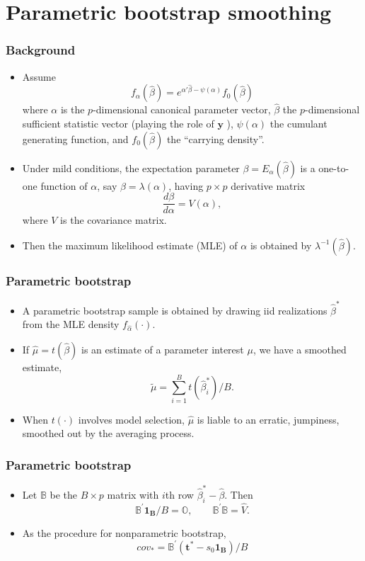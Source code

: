 \documentclass{beamer}
\begin{document}
\section{Parametric bootstrap smoothing}
\begin{frame}
\frametitle{Background}
\begin{itemize}
\item Assume $$f_\alpha(\hat{\beta}) = e^{\alpha'\hat{\beta} - \psi(\alpha)} f_0(\hat{\beta})$$
where $\alpha$ is the $p$-dimensional canonical parameter vector, $\hat{\beta}$ the $p$-dimensional sufficient statistic vector (playing the role of $\mathbf{y}$ ), $\psi(\alpha)$ the cumulant generating function, and $f_0(\hat{\beta})$ the ``carrying density''.
\item Under mild conditions, the expectation parameter $\beta= E_\alpha (\hat{\beta})$ is a one-to-one function of $\alpha$, say $\beta = \lambda(\alpha)$, having $p\times p$ derivative matrix
$$ \frac{d\beta}{d\alpha} = V(\alpha),$$
where $V$ is the covariance matrix. 
\item Then the maximum likelihood estimate (MLE) of $\alpha$ is obtained by $\lambda^{-1}(\hat{\beta})$.
\end{itemize}
\end{frame}
\begin{frame}
\frametitle{Parametric bootstrap}
\begin{itemize}
\item A parametric bootstrap sample is obtained by drawing iid realizations $\hat{\beta}^*$ from the MLE density $f_{\hat{\alpha}}(\cdot)$.
\item If $\hat{\mu} = t(\hat{\beta})$ is an estimate of a parameter interest $\mu$, we have a smoothed estimate,
$$ \tilde{\mu} = \sum_{i=1} ^B t(\hat{\beta}_i ^*)/B.$$
\item When $t(\cdot)$ involves model selection, $\hat{\mu}$ is liable to an erratic, jumpiness, smoothed out by the averaging process.
\end{itemize}
\end{frame}
\begin{frame}
\frametitle{Parametric bootstrap}
\begin{itemize}
\item Let $\mathbb{B}$ be the $B \times p$ matrix with $i$th row $\hat{\beta}_i ^*-\hat{\beta}$. Then
$$ \mathbb{B}^{'} \mathbf{1_B}/B = \mathbb{O}, \qquad \mathbb{B}^{'} \mathbb{B} = \hat{V}.$$
\item As the procedure for nonparametric bootstrap, 
$$ cov_* = \mathbb{B}^{'} (\mathbf{t^*} - s_0 \mathbf{1_B})/B $$
\end{itemize}
\end{frame}
\end{document}
